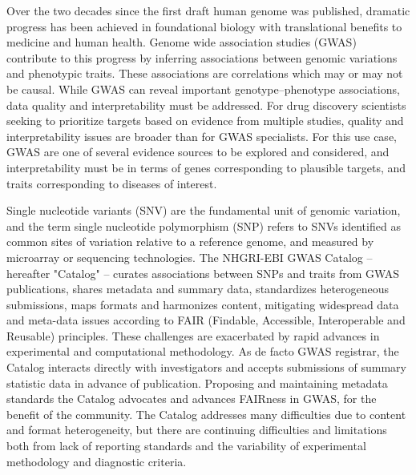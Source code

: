 Over the two decades since the first draft human genome was published, dramatic progress has been achieved in foundational biology with translational benefits to medicine and human health. Genome wide association studies (GWAS) contribute to this progress by inferring associations between genomic variations and phenotypic traits\cite{Bosse2018-yl,Rusu2017-en}. These associations are correlations which may or may not be causal. While GWAS can reveal important genotype–phenotype associations, data quality and interpretability must be addressed\cite{Lambert2012-tr,Visscher2017-jp,Marigorta2018-xk,Gallagher2018-ev}.  For drug discovery scientists seeking to prioritize targets based on evidence from multiple studies, quality and interpretability issues are broader than for GWAS specialists. For this use case, GWAS are one of several evidence sources to be explored and considered, and interpretability must be in terms of genes corresponding to plausible targets, and traits corresponding to diseases of interest.

Single nucleotide variants (SNV) are the fundamental unit of genomic variation, and the term single nucleotide polymorphism (SNP) refers to SNVs identified as common sites of variation relative to a reference genome, and measured by microarray or sequencing technologies. The NHGRI-EBI GWAS Catalog\cite{Buniello2019-iw} -- hereafter "Catalog" -- curates associations between SNPs and traits from GWAS publications, shares metadata and summary data, standardizes heterogeneous submissions, maps formats and harmonizes content, mitigating widespread data and meta-data issues according to FAIR (Findable, Accessible, Interoperable and Reusable) principles\cite{Wilkinson2016-xu}. These challenges are exacerbated by rapid advances in experimental and computational methodology. As de facto GWAS registrar, the Catalog interacts directly with investigators and accepts submissions of summary statistic data in advance of publication. Proposing and maintaining metadata standards the Catalog advocates and advances FAIRness in GWAS, for the benefit of the community. The Catalog addresses many difficulties due to content and format heterogeneity, but there are continuing difficulties and limitations both from lack of reporting standards and the variability of experimental methodology and diagnostic criteria.

